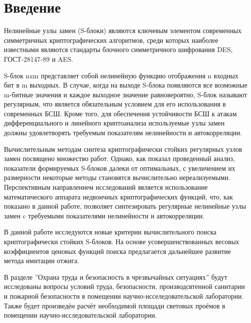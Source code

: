 \chapter*{Введение}

Нелинейные узлы замен (S-блоки) являются ключевым элементом современных
симметричных криптографических алгоритмов, среди которых наиболее известными
являются стандарты блочного симметричного шифрования DES, ГОСТ-28147-89 и AES. 

S-блок nxm представляет собой нелинейную функцию отображения n входных бит в m
выходных. В случае, когда на выходе S-блока появляются все возможные m-битные
значения и каждое выходное значение равновероятно, S-блок называют регулярным,
что является обязательным условием для его использования в современных БСШ.
Кроме того, для обеспечения устойчивости БСШ к атакам дифференциального и
линейного криптоанализа используемые узлы замен должны удовлетворять требуемым
показателям нелинейности и автокорреляции.

Вычислительным методам синтеза криптографически стойких регулярных узлов замен
посвящено множество работ. Однако, как показал проведенный анализ, показатели
формируемых S-блоков далеки от оптимальных, с увеличением их размерности
некоторые методы становятся вычислительно нереализуемыми.  Перспективным
направлением исследований является использование математического аппарата
недвоичных криптографических функций, что, как показано в данной работе,
позволяет синтезировать регулярные нелинейные узлы замен c требуемыми
показателями нелинейности и автокорреляции.

В данной работе исследуются новые критерии вычислительного поиска
криптографически стойких S-блоков. На основе усовершенствованных весовых
коэффициентов ценовых функций поиска предлагается дальнейшее развитие метода
имитации отжига.

В разделе ''Охрана труда и безопасность в чрезвычайных ситуациях'' будут
исследованы вопросы условий труда, безопасности, производсвтенной санитарии и
пожарной безопасности в помещении научно-исселедовательской лаборатории. Также
будет произведён расчёт необходимой площади световых проёмов в помещении
научно-исследовательской лаборатории.
